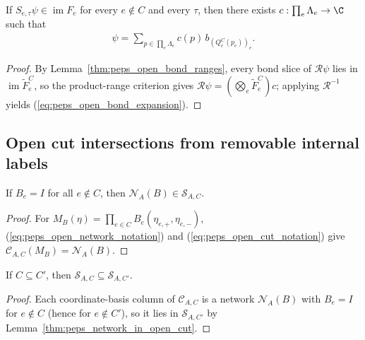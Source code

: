 \begin{lemma}%
    \label{thm:peps_open_bond_expansion}
    \leanok
    If $S_{e,\tau}\psi\in\operatorname{im}F_e$ for every $e\notin C$ and every
    $\tau$, then there exists $c:\prod_e\Lambda_e\to\C$ such that
    \begin{align}
        \psi=\sum_{p\in\prod_e\Lambda_e}
        c(p)\,b_{(Q_e^C(p_e))_e}.
        \label{eq:peps_open_bond_expansion}
    \end{align}
\end{lemma}
\begin{proof}\leanok
    By Lemma~\ref{thm:peps_open_bond_ranges}, every bond slice of
    $\mathcal R\psi$ lies in $\operatorname{im}\widetilde F_e^C$, so the
    product-range criterion gives $\mathcal R\psi=(\bigotimes_e\widetilde F_e^C)c$;
    applying $\mathcal R^{-1}$ yields (\ref{eq:peps_open_bond_expansion}).
\end{proof}

\subsection{Open cut intersections from removable internal labels}
\label{sec:peps_dependent_open_intersection}

\begin{lemma}%
    \label{thm:peps_network_in_open_cut}
    \leanok
    If $B_e=I$ for all $e\notin C$, then $\mathcal N_A(B)\in\mathcal S_{A,C}$.
\end{lemma}
\begin{proof}\leanok
    For $M_B(\eta)=\prod_{e\in C}B_e(\eta_{e,+},\eta_{e,-})$,
    (\ref{eq:peps_open_network_notation}) and (\ref{eq:peps_open_cut_notation})
    give $\mathcal C_{A,C}(M_B)=\mathcal N_A(B)$.
\end{proof}

\begin{lemma}%
    \label{thm:peps_cut_space_mono}
    \leanok
    If $C\subseteq C'$, then
    $\mathcal S_{A,C}\subseteq\mathcal S_{A,C'}$.
\end{lemma}
\begin{proof}\leanok
    Each coordinate-basis column of $\mathcal C_{A,C}$ is a network
    $\mathcal N_A(B)$ with $B_e=I$ for $e\notin C$ (hence for $e\notin C'$), so
    it lies in $\mathcal S_{A,C'}$ by Lemma~\ref{thm:peps_network_in_open_cut}.
\end{proof}

